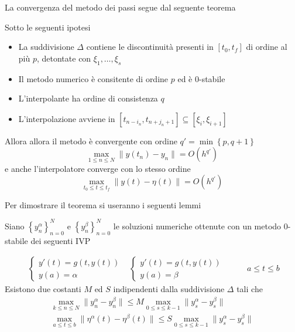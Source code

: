 La convergenza del metodo dei passi segue dal seguente teorema

\begin{thm}
 Sotto le seguenti ipotesi
  \begin{itemize}
   \item La suddivisione $\Delta$ contiene le discontinuità presenti in $[t_0,t_f]$  di ordine al più $p$, detontate con $\xi_1, \dots, \xi_s$
   \item Il metodo numerico è consitente di ordine $p$ ed è 0-stabile
   \item L'interpolante ha ordine di consistenza $q$
   \item L'interpolazione avviene in $[t_{n-i_n},t_{n+j_n+1}] \subseteq [\xi_i, \xi_{i+1}]$
  \end{itemize}
Allora allora il metodo è convergente con ordine $q' = \min \left \{ p,q+1 \right \}$
$$
\max_{1 \le n \le N} \| y(t_n) - y_n \| = O(h^{q'})
$$
e anche l'interpolatore converge con lo stesso ordine
$$
\max_{t_0 \le t \le t_f} \| y(t) - \eta(t) \| = O(h^{q'})
$$
\end{thm}

Per dimostrare il teorema si useranno i seguenti lemmi 

\begin{lemma}
 Siano $\left \{ y_n^{\alpha} \right \}_{n=0}^N$ e $\left \{ y_n^{\beta} \right \}_{n=0}^N$ le soluzioni numeriche ottenute 
 con un metodo $0$-stabile dei seguenti IVP

$$
\begin{array}{cc}
 \begin{cases}
    y'(t)=g(t,y(t))	\\
    y(a)=\alpha
 \end{cases}
&
 \begin{cases}
    y'(t)=g(t,y(t))	\\
    y(a)=\beta
 \end{cases}
\end{array}
\hspace{1cm}
a \le t \le b
$$
Esistono due costanti $M$ ed $S$  indipendenti dalla suddivisione $\Delta$ tali che
\renewcommand\arraystretch{1,5}
$$
\begin{array}{lc}
\displaystyle
\max_{k \le n \le N} \| y_n^\alpha - y_n^\beta \| \le M \max_{0 \le s \le k-1} \| y_s^\alpha - y_s^\beta \|	\\
\displaystyle
\max_{a \le t \le b} \| \eta^\alpha(t) - \eta^\beta(t) \| \le S \max_{0 \le s \le k-1} \| y_s^\alpha - y_s^\beta \|
\end{array}
$$
\renewcommand\arraystretch{1}


\end{lemma}

